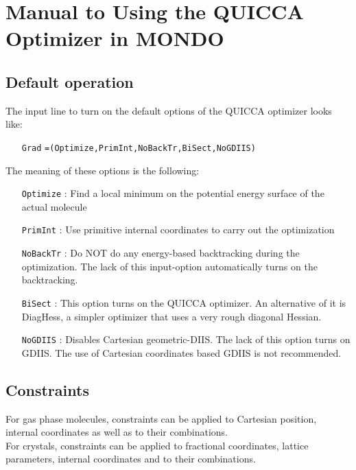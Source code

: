 \documentclass[prl,aps,preprint,superbib,12pt]{revtex4}
\begin{document}

\section{Manual to Using the QUICCA Optimizer in MONDO}

\subsection{Default operation}
The input line to turn on the default options of the QUICCA optimizer
looks like:
\begin{itemize}
\item[{\tt Grad}]{\tt =(Optimize,PrimInt,NoBackTr,BiSect,NoGDIIS) }
\end{itemize}

\noindent
The meaning of these options is the following:
\begin{itemize}
\item[{\tt Optimize}] : Find a local minimum on the potential energy surface of the actual molecule
\item[{\tt PrimInt}] : Use primitive internal coordinates to carry out the optimization
\item[{\tt NoBackTr}] : Do NOT do any energy-based backtracking during
the optimization. The lack of this input-option automatically
turns on the backtracking.
\item[{\tt BiSect}] : This option turns on the QUICCA optimizer. An alternative of it is DiagHess, a simpler optimizer that uses a very rough 
diagonal Hessian.
\item[{\tt NoGDIIS}] : Disables Cartesian geometric-DIIS. The lack of this 
option turns on GDIIS. The use of Cartesian coordinates based 
GDIIS is not recommended.
\end{itemize}
 
\subsection{Constraints}

For gas phase molecules, constraints can be applied to 
Cartesian position, internal coordinates as well as to their 
combinations.
\\
For crystals, constraints can be applied to fractional coordinates,
lattice parameters, internal coordinates and to their combinations.
\end{document}
